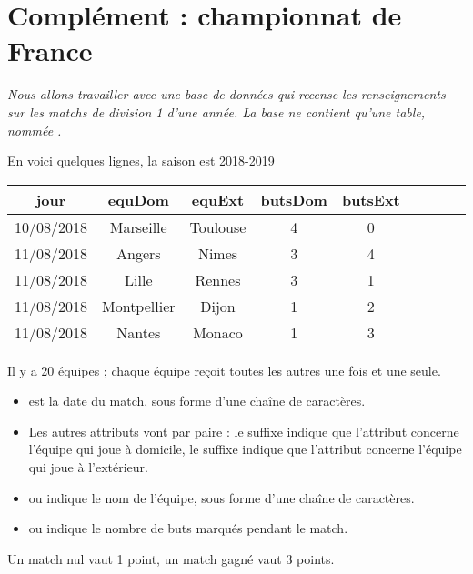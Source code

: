 \section{Complément : championnat de France}
{\it Nous allons travailler avec une base de données qui recense les renseignements sur les matchs de division 1 d'une année.
La base ne contient qu'une table, nommée .

\medskip

En voici quelques lignes, la saison est 2018-2019
\begin{center}
\begin{tabular}{|c|c|c|c|c|c|c|c|c|}
\hline
jour       &equDom        &equExt    &butsDom &butsExt \\%
\hline
10/08/2018 & Marseille    & Toulouse & 4 & 0\\
11/08/2018 & Angers       & Nimes    & 3 & 4\\
11/08/2018 & Lille        & Rennes   & 3 & 1\\
11/08/2018 & Montpellier  & Dijon    & 1 & 2\\
11/08/2018 & Nantes       & Monaco   & 1 & 3\\
\end{tabular}
\end{center}
Il y a 20 équipes ; chaque équipe reçoit toutes les autres une fois et une seule.

\begin{itemize}
\item {} est la date du match, sous forme d'une chaîne de caractères.
\item Les autres attributs vont par paire : le suffixe  indique que l'attribut concerne l'équipe qui joue à domicile, le suffixe  indique que l'attribut concerne l'équipe qui joue à l'extérieur.
\item {} ou  indique le nom de l'équipe, sous forme d'une chaîne de caractères.
\item {} ou  indique le nombre de buts marqués pendant le match.
\end{itemize}

Un match nul vaut 1 point, un match gagné vaut 3 points.
}
